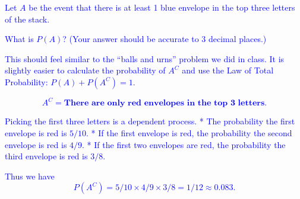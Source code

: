 \documentclass[
]{article}
\begin{document}
\textcolor{blue}{Let $A$ be the event that there is at least 1 blue envelope in the top three letters of the stack.}

\textcolor{blue}{What is $P(A)$? (Your answer should be accurate to 3 decimal places.)}

\textcolor{blue}{This should feel similar to the ``balls and urns'' problem we did in class. It is slightly easier to calculate the probability of $A^C$ and use the Law of Total Probability: $P(A) + P(A^C) = 1.$}

\textcolor{blue}{$$A^C = \textbf{There are only red envelopes in the top 3 letters.}$$}

\textcolor{blue}{Picking the first three letters is a dependent process.
* The probability the first envelope is red is $5/10$.
* If the first envelope is red, the probability the second envelope is red is $4/9$.
* If the first two envelopes are red, the probability the third envelope is red is $3/8$.}

\textcolor{blue}{Thus we have
$$P(A^C) = 5/10 \times 4/9 \times 3/8 = 1/12 \approx 0.083.$$}
\end{document}
